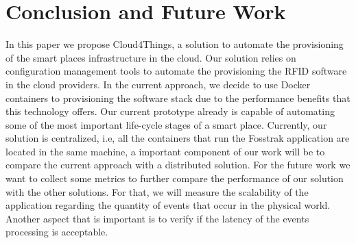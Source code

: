 \section{Conclusion and Future Work}
\label{sec:conclusion}
In this paper we propose Cloud4Things, a solution to automate the provisioning of the smart places
infrastructure in the cloud. Our solution relies on configuration management tools to automate the
provisioning the RFID software in the cloud providers. In the current approach, we decide to use
Docker containers to provisioning the software stack due to the performance benefits that this
technology offers. Our current prototype already is capable of automating some of the most important
life-cycle stages of a smart place. Currently, our solution is centralized, i.e, all the containers that run
the Fosstrak application are located in the same machine, a important component of our work will be to
compare the current approach with a distributed solution. For the future work we want to collect some
metrics to further compare the performance of our solution with the other solutions. For that, we will measure
the scalability of the application regarding the quantity of events that occur in the physical world. Another aspect
that is important is to verify if the latency of the events processing is acceptable.
